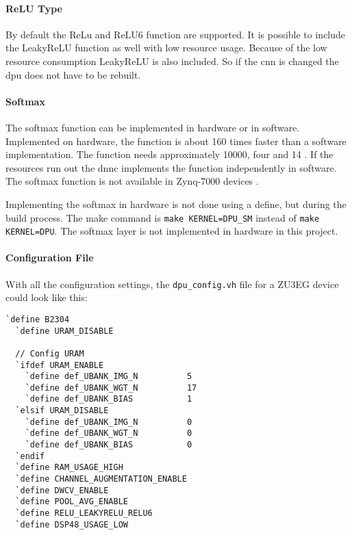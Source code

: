 \paragraph{ReLU Type}
By default the ReLu and ReLU6 function are supported.
It is possible to include the LeakyReLU function as well with low resource usage.
Because of the low resource consumption LeakyReLU is also included.
So if the \acrshort{cnn} is changed the \acrshort{dpu} does not have to be rebuilt. 

\paragraph{Softmax}
The softmax function can be implemented in hardware or in software.
Implemented on hardware, the function is about 160 times faster than a software implementation.
The function needs approximately \SI{10000}{}, four  and 14 .
If the resources run out the \acrlong{dnnc} implements the function independently in software.
The softmax function is not available in Zynq-7000 devices \cite{dpu_product_guide}. 

Implementing the softmax in hardware is not done using a define, but during the build process.
The make command is \texttt{make KERNEL=DPU\_SM} instead of \texttt{make KERNEL=DPU}.
The softmax layer is not implemented in hardware in this project.

\paragraph{Configuration File}
With all the configuration settings, the \texttt{dpu\_config.vh} file for a ZU3EG device could look like this:

\begin{lstlisting}[style=bash, caption={Configure \acrshort{dpu}}, label=lst:config_dpu]
  `define B2304
  `define URAM_DISABLE 

  // Config URAM
  `ifdef URAM_ENABLE
    `define def_UBANK_IMG_N          5
    `define def_UBANK_WGT_N          17
    `define def_UBANK_BIAS           1
  `elsif URAM_DISABLE
    `define def_UBANK_IMG_N          0
    `define def_UBANK_WGT_N          0
    `define def_UBANK_BIAS           0
  `endif
  `define RAM_USAGE_HIGH
  `define CHANNEL_AUGMENTATION_ENABLE
  `define DWCV_ENABLE
  `define POOL_AVG_ENABLE
  `define RELU_LEAKYRELU_RELU6
  `define DSP48_USAGE_LOW
\end{lstlisting}

